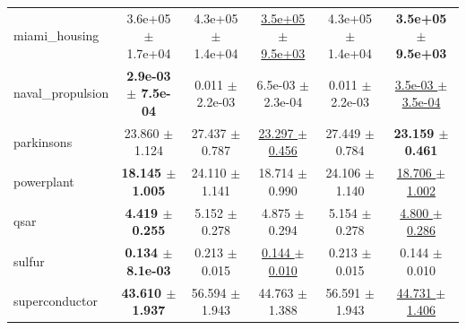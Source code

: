 \begin{table}[!htbp]
{\begin{tabular}{lccccc}
miami\_housing & 3.6e+05 $\pm$ 1.7e+04 & 4.3e+05 $\pm$ 1.4e+04 & \underline{3.5e+05 $\pm$ 9.5e+03} & 4.3e+05 $\pm$ 1.4e+04 & \textbf{3.5e+05 $\pm$ 9.5e+03} \\
naval\_propulsion & \textbf{2.9e-03 $\pm$ 7.5e-04} & 0.011 $\pm$ 2.2e-03 & 6.5e-03 $\pm$ 2.3e-04 & 0.011 $\pm$ 2.2e-03 & \underline{3.5e-03 $\pm$ 3.5e-04} \\
parkinsons & 23.860 $\pm$ 1.124 & 27.437 $\pm$ 0.787 & \underline{23.297 $\pm$ 0.456} & 27.449 $\pm$ 0.784 & \textbf{23.159 $\pm$ 0.461} \\
powerplant & \textbf{18.145 $\pm$ 1.005} & 24.110 $\pm$ 1.141 & 18.714 $\pm$ 0.990 & 24.106 $\pm$ 1.140 & \underline{18.706 $\pm$ 1.002} \\
qsar & \textbf{4.419 $\pm$ 0.255} & 5.152 $\pm$ 0.278 & 4.875 $\pm$ 0.294 & 5.154 $\pm$ 0.278 & \underline{4.800 $\pm$ 0.286} \\
sulfur & \textbf{0.134 $\pm$ 8.1e-03} & 0.213 $\pm$ 0.015 & \underline{0.144 $\pm$ 0.010} & 0.213 $\pm$ 0.015 & 0.144 $\pm$ 0.010 \\
superconductor & \textbf{43.610 $\pm$ 1.937} & 56.594 $\pm$ 1.943 & 44.763 $\pm$ 1.388 & 56.591 $\pm$ 1.943 & \underline{44.731 $\pm$ 1.406} \\
\bottomrule
\end{tabular}
}
\end{table}